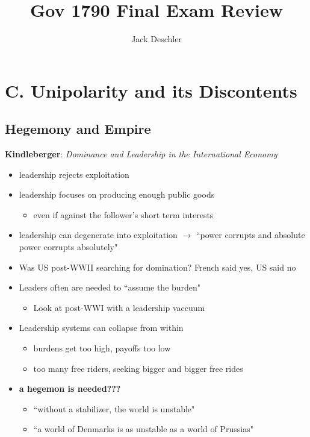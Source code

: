 \documentclass{article}
\title{Gov 1790 Final Exam Review}
\author{Jack Deschler}
\begin{document}
\maketitle

\section*{C. Unipolarity and its Discontents}
\subsection*{Hegemony and Empire}
\textbf{Kindleberger}: \textit{Dominance and Leadership in the International Economy}\\
\renewcommand\labelitemii{$\cdot$}
\begin{itemize}
    \item leadership rejects exploitation
    \item leadership focuses on producing enough public goods
    \begin{itemize}
        \item even if against the follower's short term interests
    \end{itemize}
    \item leadership can degenerate into exploitation $\rightarrow$ ``power corrupts and absolute power corrupts absolutely"
    \item Was US post-WWII searching for domination? French said yes, US said no
    \item Leaders often are needed to ``assume the burden"
    \begin{itemize}
        \item Look at post-WWI with a leadership vaccuum
    \end{itemize}
    \item Leadership systems can collapse from within
    \begin{itemize}
        \item burdens get too high, payoffs too low
        \item too many free riders, seeking bigger and bigger free rides
    \end{itemize}
    \item \textbf{a hegemon is needed???}
    \begin{itemize}
        \item ``without a stabilizer, the world is unstable"
        \item ``a world of Denmarks is as unstable as a world of Prussias"
    \end{itemize}
\end{itemize}
\end{document}
